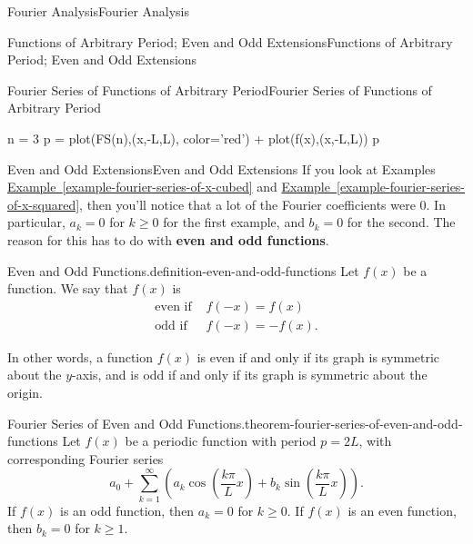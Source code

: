 \documentclass[10pt,]{book}
\newcommand{\terminology}[1]{\textbf{#1}}
\numberwithin{equation}{section}
\begin{document}
\begin{chapterptx}{Fourier Analysis}{}{Fourier Analysis}{}{}
\begin{sectionptx}{Functions of Arbitrary Period; Even and Odd Extensions}{}{Functions of Arbitrary Period; Even and Odd Extensions}{}{}
\begin{subsectionptx}{Fourier Series of Functions of Arbitrary Period}{}{Fourier Series of Functions of Arbitrary Period}{}{}
\begin{sageinput}
n = 3
p = plot(FS(n),(x,-L,L), color='red') + plot(f(x),(x,-L,L))
p
\end{sageinput}
\end{subsectionptx}
%
%
\typeout{************************************************}
\typeout{************************************************}
%
\begin{subsectionptx}{Even and Odd Extensions}{}{Even and Odd Extensions}{}{}\label{subsection-even-and-odd-extensions}
\hypertarget{p-398}{}%
If you look at Examples \hyperref[example-fourier-series-of-x-cubed]{Example~\ref{example-fourier-series-of-x-cubed}} and \hyperref[example-fourier-series-of-x-squared]{Example~\ref{example-fourier-series-of-x-squared}}, then you'll notice that a lot of the Fourier coefficients were \(0\). In particular, \(a_{k} = 0\) for \(k\geq0\) for the first example, and \(b_{k}=0\) for the second. The reason for this has to do with \terminology{even and odd functions}.%
\begin{definition}{Even and Odd Functions.}{definition-even-and-odd-functions}%
\hypertarget{p-399}{}%
Let \(f(x)\) be a function. We say that \(f(x)\) is%
\begin{align*}
\text{even if } & f(-x) = f(x)\\
\text{odd if } & f(-x) = -f(x).
\end{align*}
%
\end{definition}
\hypertarget{p-400}{}%
In other words, a function \(f(x)\) is even if and only if its graph is symmetric about the \(y\)-axis, and is odd if and only if its graph is symmetric about the origin.%
\begin{theorem}{Fourier Series of Even and Odd Functions.}{}{theorem-fourier-series-of-even-and-odd-functions}%
\hypertarget{p-401}{}%
Let \(f(x)\) be a periodic function with period \(p = 2L\), with corresponding Fourier series%
\begin{equation*}
a_{0}+\sum_{k=1}^{\infty}\left(a_{k}\cos\left(\frac{k\pi}{L}x\right)+b_{k}\sin\left(\frac{k\pi}{L}x\right)\right).
\end{equation*}
If \(f(x)\) is an odd function, then \(a_{k} = 0\) for \(k\geq0\). If \(f(x)\) is an even function, then \(b_{k}=0\) for \(k\geq1\).%
\end{theorem}
\hypertarget{p-402}{}%

\end{subsectionptx}
\end{sectionptx}
\end{chapterptx}
\end{document}
